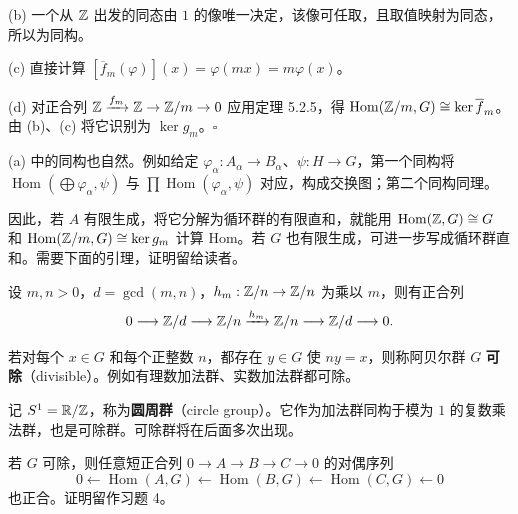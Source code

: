 (b) 一个从 $\mathbb{Z}$ 出发的同态由 $1$ 的像唯一决定，该像可任取，且取值映射为同态，所以为同构。

(c) 直接计算 $[\overline f_m(\varphi)](x)=\varphi(mx)=m\varphi(x)$。

(d) 对正合列 $\mathbb{Z}\xrightarrow{f_m}\mathbb{Z}\to\mathbb{Z}/m\to0$ 应用定理 5.2.5，得 $\operatorname{Hom}(\mathbb{Z}/m,G)\cong\ker\overline f_m$。由 (b)、(c) 将它识别为 $\ker g_m$。\hfill$\square$

(a) 中的同构也自然。例如给定 $\varphi_\alpha:A_\alpha\to B_\alpha$、$\psi:H\to G$，第一个同构将 $\operatorname{Hom}(\bigoplus\varphi_\alpha,\psi)$ 与 $\prod\operatorname{Hom}(\varphi_\alpha,\psi)$ 对应，构成交换图；第二个同构同理。

因此，若 $A$ 有限生成，将它分解为循环群的有限直和，就能用 $\operatorname{Hom}(\mathbb{Z},G)\cong G$ 和 $\operatorname{Hom}(\mathbb{Z}/m,G)\cong\ker g_m$ 计算 Hom。若 $G$ 也有限生成，可进一步写成循环群直和。需要下面的引理，证明留给读者。

设 $m,n>0$，$d=\gcd(m,n)$，$h_m:\mathbb{Z}/n\to\mathbb{Z}/n$ 为乘以 $m$，则有正合列
\[
0\longrightarrow\mathbb{Z}/d\longrightarrow\mathbb{Z}/n\xrightarrow{h_m}\mathbb{Z}/n\longrightarrow\mathbb{Z}/d\longrightarrow0.
\]

若对每个 $x\in G$ 和每个正整数 $n$，都存在 $y\in G$ 使 $ny=x$，则称阿贝尔群 $G$ \textbf{可除}（divisible）。例如有理数加法群、实数加法群都可除。

记 $S^1=\mathbb{R}/\mathbb{Z}$，称为\textbf{圆周群}（circle group）。它作为加法群同构于模为 $1$ 的复数乘法群，也是可除群。可除群将在后面多次出现。

若 $G$ 可除，则任意短正合列 $0\to A\to B\to C\to0$ 的对偶序列
\[
0\leftarrow\operatorname{Hom}(A,G)\leftarrow\operatorname{Hom}(B,G)\leftarrow\operatorname{Hom}(C,G)\leftarrow0
\]
也正合。证明留作习题 4。

